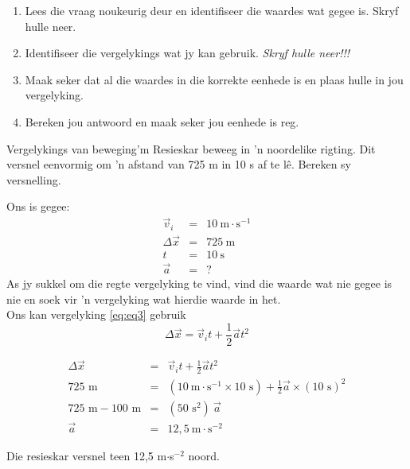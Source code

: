 \begin{enumerate}[noitemsep, label=\textbf{\arabic*}. ] 
    \item Lees die vraag noukeurig deur en identifiseer die waardes wat gegee is. Skryf hulle neer.
    \item Identifiseer die vergelykings wat jy kan gebruik. \textsl{Skryf hulle neer!!!}
    \item Maak seker dat al die waardes in die korrekte eenhede is en plaas hulle in jou vergelyking.
    \item Bereken jou antwoord en maak seker jou eenhede is reg.
\end{enumerate}

	\par
      \label{m38796*uid134}
            
\begin{wex}{Vergelykings van beweging}{'m Resieskar beweeg in 'n noordelike rigting. Dit versnel eenvormig om 'n afstand van 725 m in 10 s af te l\^e. Bereken sy versnelling.}
{
Ons is gegee:
\begin{eqnarray*}
\vec{v}_i&=&10\ \text{m} \cdot \text{s}^{-1}\\
\Delta \vec{x}&=&725\ \text{m}\\
t&=&10\ \text{s}\\
\vec{a}&=&?
\end{eqnarray*}
As jy sukkel om die regte vergelyking te vind, vind die waarde wat nie gegee is nie en soek vir 'n vergelyking wat hierdie waarde in het. \\
Ons kan vergelyking \ref{eq:eq3} gebruik
\begin{displaymath}
\Delta \vec{x}=\vec{v}_it +\frac{1}{2}\vec{a}t^2
\end{displaymath}

\begin{eqnarray*}
\Delta \vec{x} &=& \vec{v}_it +\frac{1}{2}\vec{a}t^2\\
725\text{~m} &=& (10~\text{m}\cdot \text{s}^{-1} \times 10\text{~s}) + \frac{1}{2} \vec{a} \times (10\text{~s})^2\\
725\text{~m} - 100\text{~m} &=& (50\text{~s}^2)~ \vec{a}\\
\vec{a} &=& 12,5~ \text{m} \cdot\text{s}^{-2}
\end{eqnarray*}

Die resieskar versnel teen 12,5 m$\cdot$s$^{-2}$ noord.}
\end{wex}

